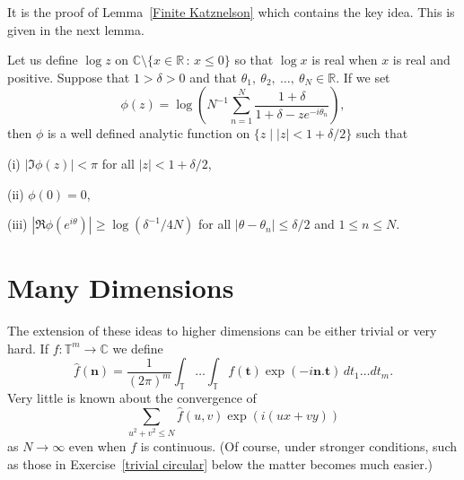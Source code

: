It is the proof of Lemma~\ref{Finite Katznelson}
which contains the key idea. This is given
in the next lemma.
\begin{lemma} Let us define $\log z$ on
${\mathbb C}\setminus\{x\in{\mathbb R}\,:\, x\leq 0\}$
so that $\log x$ is real when $x$ is real and positive.
Suppose that $1>\delta>0$ and that
$\theta_{1},\ \theta_{2},\ \dots,\ \theta_{N}\in{\mathbb R}$.
If we set
\[\phi(z)=\log\left(N^{-1}\sum_{n=1}^{N}
\frac{1+\delta}{1+\delta-ze^{-i\theta_{n}}}\right),\]
then $\phi$ is a well defined analytic function
on $\{z\mid |z|<1+\delta/2\}$ such that

(i) $|\Im \phi(z)|<\pi$ for all $|z|<1+\delta/2$,

(ii) $\phi(0)=0$,

(iii) $|\Re \phi(e^{i\theta})|\geq \log(\delta^{-1}/4N)$
for all $|\theta-\theta_{n}|\leq\delta/2$
and $1\leq n\leq N$.
\end{lemma}
\section{Many Dimensions} The extension of these
ideas to higher dimensions can be either trivial
or very hard. If $f:{\mathbb T}^{m}\rightarrow{\mathbb C}$
we define
\[\hat{f}({\mathbf n})=\frac{1}{(2\pi)^{m}}
\int_{\mathbb T}\dots \int_{\mathbb T}
f({\mathbf t})\exp(-i{\mathbf n}.{\mathbf t})
\,dt_{1}\dots dt_{m}.\]
Very little is known about the convergence of
\[\sum_{u^{2}+v^{2}\leq N}\hat{f}(u,v)\exp(i(ux+vy))\]
as $N\rightarrow\infty$ even when $f$ is continuous.
(Of course, under stronger conditions, such as those
in Exercise~\ref{trivial circular} below the matter
becomes much easier.)


